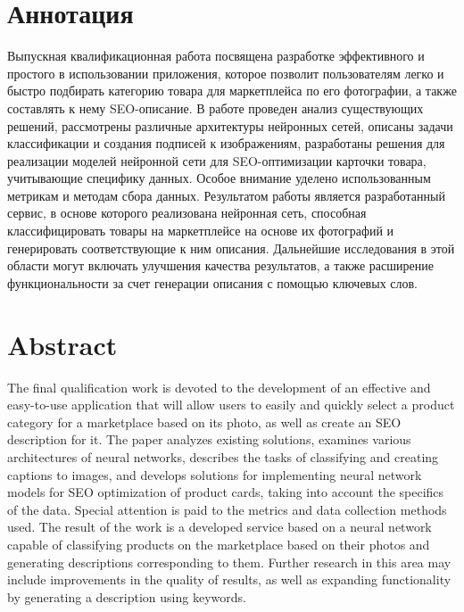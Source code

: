 \documentclass[a4paper,12pt]{extarticle}
\begin{document}
\newpage
\setcounter{page}{2}

{
	\hypersetup{linkcolor=black}
	\tableofcontents
}

\newpage

\newpage
\section*{Аннотация}   %
Выпускная квалификационная работа посвящена разработке эффективного и простого в использовании приложения, которое позволит пользователям легко и быстро подбирать категорию товара для маркетплейса по его фотографии, а также составлять к нему SEO-описание. В работе проведен анализ существующих решений, рассмотрены различные архитектуры нейронных сетей, описаны задачи классификации и создания подписей к изображениям, разработаны решения для реализации моделей нейронной сети для SEO-оптимизации карточки товара, учитывающие специфику данных. Особое внимание уделено использованным метрикам и методам сбора данных. Результатом работы является разработанный сервис, в основе которого реализована нейронная сеть, способная классифицировать товары на маркетплейсе на основе их фотографий и генерировать соответствующие к ним описания. Дальнейшие исследования в этой области могут включать улучшения качества результатов, а также расширение функциональности за счет генерации описания с помощью ключевых слов.


\newpage
\section*{Abstract}   %
The final qualification work is devoted to the development of an effective and easy-to-use application that will allow users to easily and quickly select a product category for a marketplace based on its photo, as well as create an SEO description for it. The paper analyzes existing solutions, examines various architectures of neural networks, describes the tasks of classifying and creating captions to images, and develops solutions for implementing neural network models for SEO optimization of product cards, taking into account the specifics of the data. Special attention is paid to the metrics and data collection methods used. The result of the work is a developed service based on a neural network capable of classifying products on the marketplace based on their photos and generating descriptions corresponding to them. Further research in this area may include improvements in the quality of results, as well as expanding functionality by generating a description using keywords.
\end{document}
